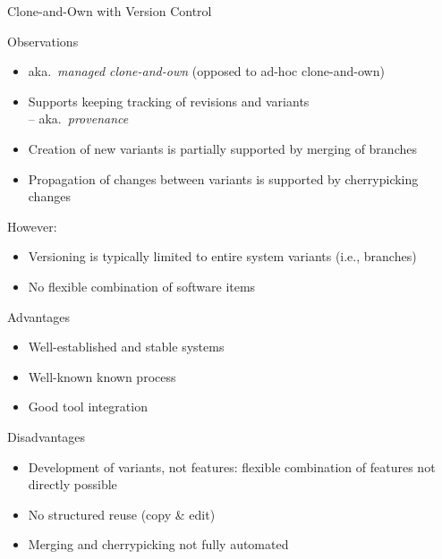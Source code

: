 \begin{frame}{Clone-and-Own with Version Control}
	\begin{mycolumns}[widths={60}]
		\begin{note}{Observations}
			\begin{itemize}
				\item aka.\ \emph{managed clone-and-own} (opposed to ad-hoc clone-and-own)
				\item Supports keeping tracking of revisions and variants\\-- aka.\ \emph{provenance} 
				\item Creation of new variants is partially supported by merging of branches
				\item Propagation of changes between variants is supported by cherrypicking changes
			\end{itemize}
			However:
			\begin{itemize}
				\item Versioning is typically limited to entire system variants (i.e., branches)
				\item No flexible combination of software items
			\end{itemize}
		\end{note}
	\mynextcolumn
		\begin{note}{Advantages}
			\begin{itemize}
				\item Well-established and stable systems
				\item Well-known known process
				\item Good tool integration	
			\end{itemize}
		\end{note}
		\begin{note}{Disadvantages}
			\begin{itemize}
				\item Development of variants, not features: flexible combination of features not directly possible
				\item No structured reuse (copy \& edit)
				\item Merging and cherrypicking not fully automated
			\end{itemize}	
		\end{note}
	\end{mycolumns}
\end{frame}
